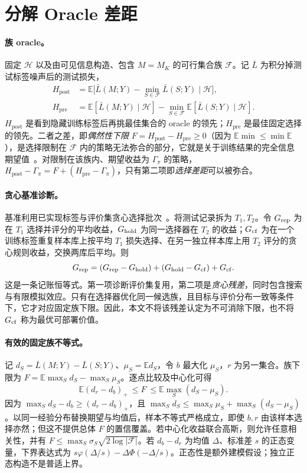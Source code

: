 \documentclass[runningheads]{llncs}
\begin{document}
\section{分解 Oracle 差距}
\label{sec:protocol}
\paragraph{族 oracle。}固定 $\mathcal H$ 以及由可见信息构造、包含 $M=M_K$ 的可行集合族 $\mathcal F$。记 $\bar L$ 为积分掉测试标签噪声后的测试损失，
\begin{align}
 H_{\mathrm{post}}&=\mathbb E\big[\bar L(M;Y)-\min_{S\in\mathcal F}\bar L(S;Y)\mid\mathcal H\big],\\
 H_{\mathrm{pre}}&=\mathbb E[\bar L(M;Y)\mid\mathcal H]-\min_{S\in\mathcal F}\mathbb E[\bar L(S;Y)\mid\mathcal H].
\end{align}
$H_{\mathrm{post}}$ 是看到隐藏训练标签后再挑最佳集合的 oracle 的领先；$H_{\mathrm{pre}}$ 是最佳固定选择的领先。二者之差，即\emph{偶然性下限} $F=H_{\mathrm{post}}-H_{\mathrm{pre}}\ge0$（因为 $\mathbb E\min\le\min\mathbb E$），是选择限制在 $\mathcal F$ 内的策略无法弥合的部分，它就是关于训练结果的完全信息期望值~\cite{howard1966information}。对限制在该族内、期望收益为 $\Gamma_\pi$ 的策略，$H_{\mathrm{post}}-\Gamma_\pi=F+(H_{\mathrm{pre}}-\Gamma_\pi)$，只有第二项即\emph{选择差距}可以被弥合。

\paragraph{贪心基准诊断。}基准利用已实现标签与评价集贪心选择批次~\cite{werner2023comparable,werner2024cdalbench}。将测试记录拆为 $T_1,T_2$。令 $G_{\rm rep}$ 为在 $T_1$ 选择并评分的平均收益，$G_{\rm hold}$ 为同一选择器在 $T_2$ 的收益；$G_{\rm cf}$ 为在一个训练标签重复样本库上按平均 $T_1$ 损失选择、在另一独立样本库上用 $T_2$ 评分的贪心规则收益，交换两库后平均。则
\[
G_{\rm rep}=(G_{\rm rep}-G_{\rm hold})+(G_{\rm hold}-G_{\rm cf})+G_{\rm cf}.
\]
这是一条记账恒等式。第一项诊断评价集复用，第二项是\emph{贪心残差}，同时包含搜索与有限模拟效应。只有在选择器优化同一候选族，且目标与评价分布一致等条件下，它才对应固定族下限。因此，本文不将该残差认定为不可消除下限，也不将 $G_{\rm cf}$ 称为最优可部署价值。

\paragraph{有效的固定族不等式。}记 $d_S=\bar L(M;Y)-\bar L(S;Y)$、$\mu_S=\mathbb E d_S$，令 $b$ 最大化 $\mu_S$，$r$ 为另一集合。族下限为 $F=\mathbb E\max_S d_S-\max_S\mu_S$。逐点比较及中心化可得
\begin{equation}
\mathbb E(d_r-d_b)_+\ \leq F\ \leq\mathbb E\max_S(d_S-\mu_S).\label{eq:two}
\end{equation}
因为 $\max_S d_S-d_b\ge(d_r-d_b)_+$，且 $\max_S d_S\le\max_S\mu_S+\max_S(d_S-\mu_S)$。以同一经验分布替换期望与均值后，样本不等式严格成立，即使 $b,r$ 由该样本选择亦然；但这不提供总体 $F$ 的置信覆盖。若中心化收益联合高斯，则允许任意相关性，并有 $F\le\max_S\sigma_S\sqrt{2\log|\mathcal F|}$。若 $d_b-d_r$ 为均值 $\Delta$、标准差 $s$ 的正态变量，下界表达式为 $s\varphi(\Delta/s)-\Delta\Phi(-\Delta/s)$。正态性是额外建模假设；独立正态构造不是普适上界。
\end{document}
